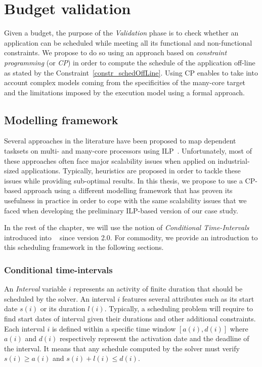 \documentclass[main.tex]{subfiles}
\begin{document}
\section{Budget validation}
Given a budget, the purpose of the \emph{Validation} phase is to check whether an application can be scheduled while meeting all its functional and non-functional constraints. We propose to do so using an approach based on \emph{constraint programming} (or \emph{CP}) in order to compute the schedule of the application off-line as stated by the Constraint~\ref{constr_schedOffLine}. Using CP enables to take into account complex models coming from the specificities of the many-core target and the limitations imposed by the execution model using a formal approach. 

\subsection{Modelling framework}
Several approaches in the literature have been proposed to map dependent tasksets on multi- and many-core processors using ILP~\cite{Becker16,gorcitz2015,PuffitschNP15}. Unfortunately, most of these approaches often face major scalability issues when applied on industrial-sized applications. Typically, heuristics are proposed in order to tackle these issues while providing sub-optimal results. In this thesis, we propose to use a CP-based approach using a different modelling framework that has proven its usefulness in practice in order to cope with the same scalability issues that we faced when developing the preliminary ILP-based version of our case study. 

In the rest of the chapter, we will use the notion of \emph{Conditional Time-Intervals}~\cite{Laborie08, Laborie09} introduced into \CPOpti~\cite{OPL} since version 2.0. For commodity, we provide an introduction to this scheduling framework in the following sections.

\subsubsection{Conditional time-intervals}
An \emph{Interval} variable $i$ represents an activity of finite duration that should be scheduled by the solver. An interval $i$ features several attributes such as its start date $s(i)$ or its duration $l(i)$. Typically, a scheduling problem will require to find start dates of interval given their durations and other additional constraints. Each interval $i$ is defined within a specific time window $[a(i) , d(i)]$ where $a(i)$ and $d(i)$ respectively represent the activation date and the deadline of the interval. It means that any schedule computed by the solver must verify $s(i) \geq a(i)$ and $s(i)+l(i) \leq d(i)$.
\end{document}

